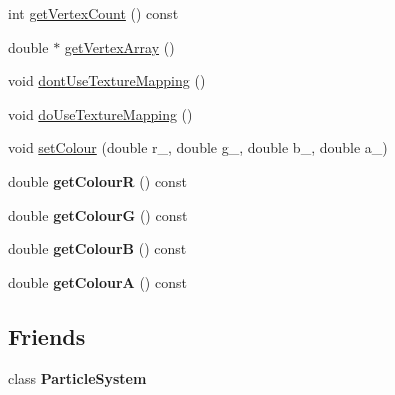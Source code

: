 \begin{DoxyCompactItemize}
\item 
int \hyperlink{classCartWheel_1_1GL_1_1GLMesh_a3658a0457dd37ecae912fe552c640bc8}{getVertexCount} () const 
\item 
double $\ast$ \hyperlink{classCartWheel_1_1GL_1_1GLMesh_aa4bc75290b6a2d716d3994016a33f862}{getVertexArray} ()
\item 
void \hyperlink{classCartWheel_1_1GL_1_1GLMesh_a7fafa8260c29a717f087c3c3236a187a}{dontUseTextureMapping} ()
\item 
void \hyperlink{classCartWheel_1_1GL_1_1GLMesh_a88c6556b7de2237ea47f958c2518e9ef}{doUseTextureMapping} ()
\item 
void \hyperlink{classCartWheel_1_1GL_1_1GLMesh_a21c06f0dc9057d5787053e9513ef44ff}{setColour} (double r\_\-, double g\_\-, double b\_\-, double a\_\-)
\item 
\hypertarget{classCartWheel_1_1GL_1_1GLMesh_a5d4490c90794a2b79880cb16438746a9}{
double {\bfseries getColourR} () const }
\label{classCartWheel_1_1GL_1_1GLMesh_a5d4490c90794a2b79880cb16438746a9}

\item 
\hypertarget{classCartWheel_1_1GL_1_1GLMesh_abef264cf7b3efc16710570f377c1ab0d}{
double {\bfseries getColourG} () const }
\label{classCartWheel_1_1GL_1_1GLMesh_abef264cf7b3efc16710570f377c1ab0d}

\item 
\hypertarget{classCartWheel_1_1GL_1_1GLMesh_af78a36adb8643e957e35f338e17fc64e}{
double {\bfseries getColourB} () const }
\label{classCartWheel_1_1GL_1_1GLMesh_af78a36adb8643e957e35f338e17fc64e}

\item 
\hypertarget{classCartWheel_1_1GL_1_1GLMesh_a4960779a76d7d73a586fc3f6b7306b26}{
double {\bfseries getColourA} () const }
\label{classCartWheel_1_1GL_1_1GLMesh_a4960779a76d7d73a586fc3f6b7306b26}

\end{DoxyCompactItemize}
\subsection*{Friends}
\begin{DoxyCompactItemize}
\item 
\hypertarget{classCartWheel_1_1GL_1_1GLMesh_a233ae59d6977e50773d931c6fd613030}{
class {\bfseries ParticleSystem}}
\label{classCartWheel_1_1GL_1_1GLMesh_a233ae59d6977e50773d931c6fd613030}

\end{DoxyCompactItemize}


